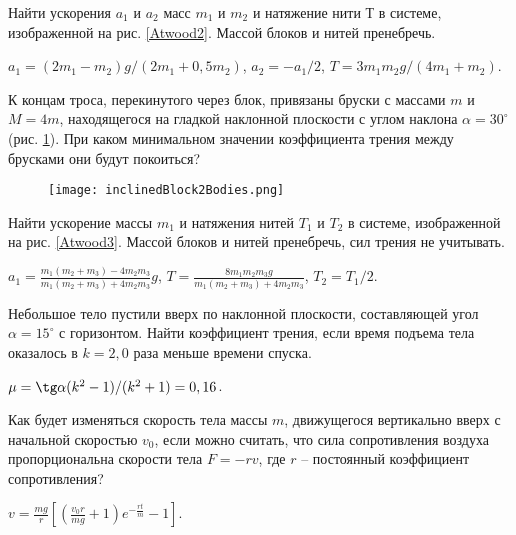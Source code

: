 \begin{ex} %
Найти ускорения $a_1$ и $a_2$ масс $m_1$ и $m_2$ и натяжение нити $Т$ в системе, изображенной на рис. \ref{Atwood2}. Массой блоков и нитей пренебречь.
\begin{ans}
$a_1 = (2m_1-m_2)g/(2m_1+0,5m_2)$, $a_2 = -a_1/2$, $T=3m_1 m_2g/(4m_1 + m_2)$.
\end{ans}
\end{ex}

\begin{ex}
К концам троса, перекинутого через блок, привязаны бруски с массами $m$ и $M = 4m$, находящегося на гладкой наклонной плоскости с углом наклона $\alpha = 30^{\circ}$ (рис. \ref{inclinedBlock2Bodies}). При каком минимальном значении коэффициента трения между брусками они будут покоиться?
\end{ex}

\begin{figure}[h]
\centering
\texttt{[image: inclinedBlock2Bodies.png]}
\caption{}
\label{inclinedBlock2Bodies}
\end{figure}

\complexProblems

\begin{ex} %
Найти ускорение массы $m_1$ и натяжения нитей $T_1$ и $T_2$ в системе, изображенной на рис. \ref{Atwood3}. Массой блоков и нитей пренебречь, сил трения не учитывать.
\begin{ans}
$a_1 = \frac{m_1(m_2+m_3)-4m_2m_3}{m_1(m_2+m_3)+4m_2m_3}g$, $T= \frac{8m_1m_2m_3g}{m_1(m_2+m_3)+4m_2m_3}$, $T_2 = T_1/2$.
\end{ans}
\end{ex}

\begin{ex} %
Небольшое тело пустили вверх по наклонной плоскости, составляющей угол $\alpha  = 15^{\circ}$ с горизонтом. Найти коэффициент трения, если время подъема тела оказалось в $k = 2,0$ раза меньше времени спуска.
\begin{ans}
$\mu = \tg \alpha (k^2-1)/(k^2+1) = 0,16$.
\end{ans}
\end{ex}

\begin{ex} %
Как будет изменяться скорость тела массы $m$, движущегося вертикально вверх с начальной скоростью $v_0$, если можно считать, что сила сопротивления воздуха пропорциональна скорости тела $F = -rv$, где $r$ -- постоянный коэффициент сопротивления?
\begin{ans}
$v = \frac{mg}{r}\left[ \left( \frac{v_0r}{mg} +1 \right)e^{-\frac{rt}{m}} - 1 \right]$.
\end{ans}
\end{ex}

\clearpage